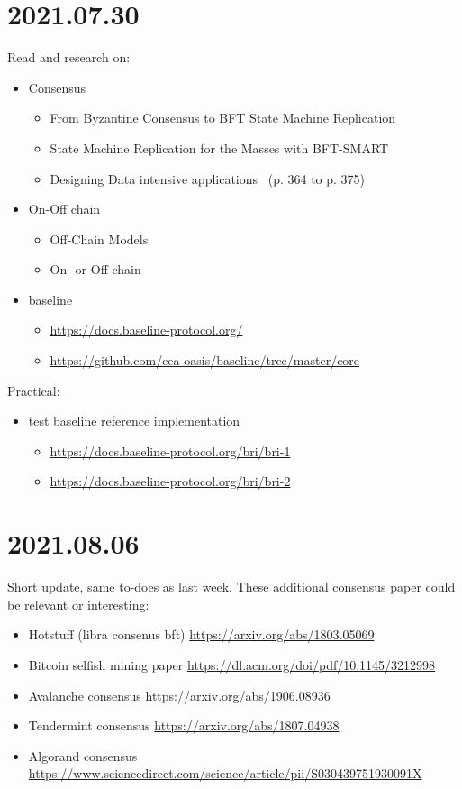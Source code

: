 \section{2021.07.30}

Read and research on:
\begin{itemize}
\item Consensus
  \begin{itemize}
  \item From Byzantine Consensus to BFT State Machine Replication~\cite{sousa12from_byzan_consen_bft_state_machin_replic}
  \item State Machine Replication for the Masses with BFT-SMART~\cite{bessani14state_machin_replic_masses_bft_smart}
  \item Designing Data intensive applications~\cite{kleppmann17desig} (p. 364 to p. 375)
\end{itemize}
\item On-Off chain
  \begin{itemize}
  \item Off-Chain Models~\cite{eberhardt18off_model_approac_off_comput}
  \item On- or Off-chain~\cite{eberhardt17off_block}
  \end{itemize}
\item baseline
  \begin{itemize}
  \item \url{https://docs.baseline-protocol.org/}
  \item \url{https://github.com/eea-oasis/baseline/tree/master/core}
\end{itemize}
\end{itemize}
Practical:
\begin{itemize}
\item test baseline reference implementation
  \begin{itemize}
  \item \url{https://docs.baseline-protocol.org/bri/bri-1}
  \item \url{https://docs.baseline-protocol.org/bri/bri-2}
  \end{itemize}
\end{itemize}

\section{2021.08.06}
Short update, same to-does as last week.
These additional consensus paper could be relevant or interesting:
\begin{itemize}
\item Hotstuff (libra consenus bft) \url{https://arxiv.org/abs/1803.05069}
\item Bitcoin selfish mining paper \url{https://dl.acm.org/doi/pdf/10.1145/3212998}
\item Avalanche consensus \url{https://arxiv.org/abs/1906.08936}
\item Tendermint consensus \url{https://arxiv.org/abs/1807.04938}
\item Algorand consensus \url{https://www.sciencedirect.com/science/article/pii/S030439751930091X}
\end{itemize}


